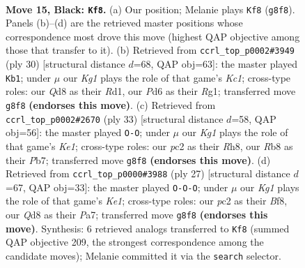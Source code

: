 \documentclass[11pt]{article}
\begin{document}
\clearpage

\begin{figure}[p]\centering
\begin{subfigure}{0.46\textwidth}\centering
\resizebox{\linewidth}{!}{%
\newchessgame
\chessboard[
  setfen={1rbqr1k1/p1p2p1p/P1pp1n2/4p3/4P3/2PP1N2/2P2PP1/R1BQ1RK1 b - - 0 15},
  showmover=false,
  pgfstyle=straightmove, color=movearrow, markmove={g8-f8}
]}
\caption{}
\end{subfigure}\hfill
\begin{subfigure}{0.46\textwidth}\centering
\resizebox{\linewidth}{!}{%
\newchessgame
\chessboard[
  setfen={1rb2rk1/p2nqppp/2p1p3/1p4P1/3P4/2QBPN2/PP3P1P/2KR2R1 w - - 2 16},
  showmover=false,
  pgfstyle=straightmove, color=movearrow, markmove={c1-b1}
]}
\caption{}
\end{subfigure}
\\[4pt]
\begin{subfigure}{0.46\textwidth}\centering
\resizebox{\linewidth}{!}{%
\newchessgame
\chessboard[
  setfen={2r1k2r/1pq1bpp1/p2ppn2/7p/2PNP2P/4BP2/PP1Q2P1/1K1R1R2 b k - 0 17},
  showmover=false,
  pgfstyle=straightmove, color=movearrow, markmove={e8-g8}
]}
\caption{}
\end{subfigure}\hfill
\begin{subfigure}{0.46\textwidth}\centering
\resizebox{\linewidth}{!}{%
\newchessgame
\chessboard[
  setfen={r3kb1r/ppnq4/2p1pp2/6pp/2PP4/2N5/PPQ2PPP/R1B1R1K1 b kq - 1 14},
  showmover=false,
  pgfstyle=straightmove, color=movearrow, markmove={e8-c8}
]}
\caption{}
\end{subfigure}
\caption{\textbf{Move 15, Black: \texttt{Kf8}.} (a) Our position; Melanie plays \texttt{Kf8} (\texttt{g8f8}). Panels (b)--(d) are the retrieved master positions whose correspondence most drove this move (highest QAP objective among those that transfer to it). (b) Retrieved from \texttt{ccrl\_top\_p0002\#3949} (ply 30) [structural distance $d$=68, QAP obj=63]: the master played \texttt{Kb1}; under $\mu$ our \emph{Kg1} plays the role of that game's \emph{Kc1}; cross-type roles: our \emph{Q}d8 as their \emph{R}d1, our \emph{P}d6 as their \emph{R}g1; transferred move \texttt{g8f8} \textbf{(endorses this move)}. (c) Retrieved from \texttt{ccrl\_top\_p0002\#2670} (ply 33) [structural distance $d$=58, QAP obj=56]: the master played \texttt{O-O}; under $\mu$ our \emph{Kg1} plays the role of that game's \emph{Ke1}; cross-type roles: our \emph{p}c2 as their \emph{R}h8, our \emph{R}b8 as their \emph{P}b7; transferred move \texttt{g8f8} \textbf{(endorses this move)}. (d) Retrieved from \texttt{ccrl\_top\_p0000\#3988} (ply 27) [structural distance $d$=67, QAP obj=33]: the master played \texttt{O-O-O}; under $\mu$ our \emph{Kg1} plays the role of that game's \emph{Ke1}; cross-type roles: our \emph{p}c2 as their \emph{B}f8, our \emph{Q}d8 as their \emph{P}a7; transferred move \texttt{g8f8} \textbf{(endorses this move)}. Synthesis: 6 retrieved analogs transferred to \texttt{Kf8} (summed QAP objective 209, the strongest correspondence among the candidate moves); Melanie committed it via the \texttt{search} selector.}
\label{fig:thought-m29}
\end{figure}
\end{document}
